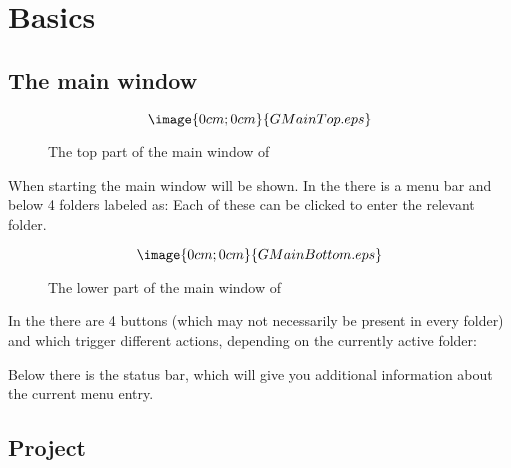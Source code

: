 \section{Basics}%
\label{basic.detailed}

\subsection{The main window}

\begin{figure}[h]
$$\image{0cm;0cm}{GMainTop.eps}$$%
\caption{The top part of the main window of \period}%
\label{mainframe.top}
\end{figure}
When starting \period the main window will be shown.
In the  there is a menu bar and 
below 4 folders labeled as:
Each of these can be clicked to enter the relevant folder.

\begin{figure}[h]
$$\image{0cm;0cm}{GMainBottom.eps}$$%
\caption{The lower part of the main window of \period}%
\label{mainframe.bottom}
\end{figure}

In the 
 there are 4 buttons 
(which may not necessarily be present in every folder)
and which trigger different actions, depending on the 
currently active folder:

Below there is the status bar, which will give you additional 
information about the current menu entry.

\subsection{Project}%
\label{project.management}

